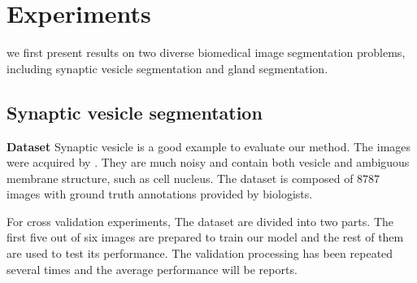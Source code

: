 \section{Experiments}
\label{sec:results}


 we first present results on two diverse biomedical image segmentation problems, including synaptic vesicle segmentation and gland segmentation.
%

\subsection{Synaptic vesicle segmentation}
\textbf{Dataset}
Synaptic vesicle is a good example to evaluate our method.
The images were acquired by . 
They are much noisy and contain both vesicle and ambiguous membrane structure, such as cell nucleus.
The dataset is composed of $8787$ images with ground truth annotations provided by biologists.
%
%
%

For cross validation experiments, The dataset are divided into two parts.
The first five out of six images are prepared to train our model and the rest of them are used to test its performance.
%
The validation processing has been repeated several times and the average performance will be reports.

